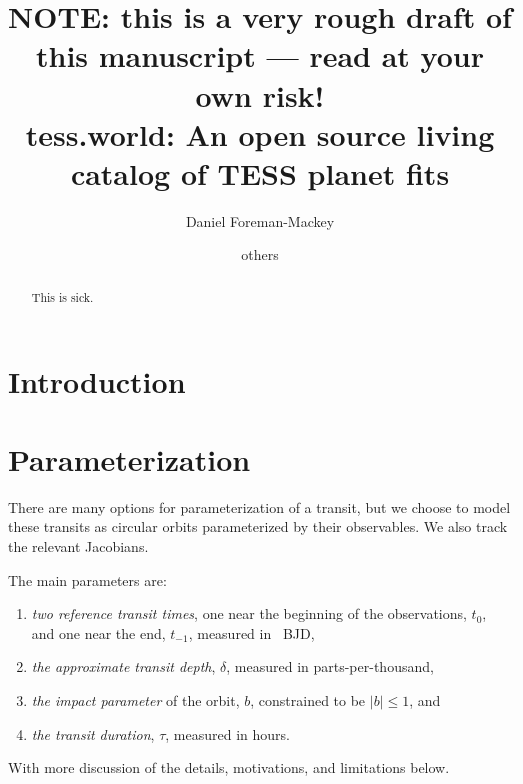 \documentclass[modern]{aastex62}
\begin{document}
\raggedbottom\sloppy\sloppypar\frenchspacing

\title{%
  {\bf NOTE: this is a very rough draft of this manuscript --- read at your own risk!}
  \\
  tess.world: An open source living catalog of TESS planet fits
}

\author[0000-0002-9328-5652]{Daniel Foreman-Mackey}

\author{others}
\noaffiliation

\begin{abstract}
  \noindent
  This is sick.
\end{abstract}


\section{Introduction}



\citep{Foreman-Mackey:2017}

\section{Parameterization}

There are many options for parameterization of a transit, but we choose to model these transits as circular orbits parameterized by their observables.
We also track the relevant Jacobians.

The main parameters are:
\begin{enumerate}
  \item \emph{two reference transit times}, one near the beginning of the observations, $t_0$, and one near the end, $t_{-1}$, measured in \tess\ BJD,
  \item \emph{the approximate transit depth}, $\delta$, measured in parts-per-thousand,
  \item \emph{the impact parameter} of the orbit, $b$, constrained to be $|b| \le 1$, and
  \item \emph{the transit duration}, $\tau$, measured in hours.
\end{enumerate}

With more discussion of the details, motivations, and limitations below.
\end{document}
